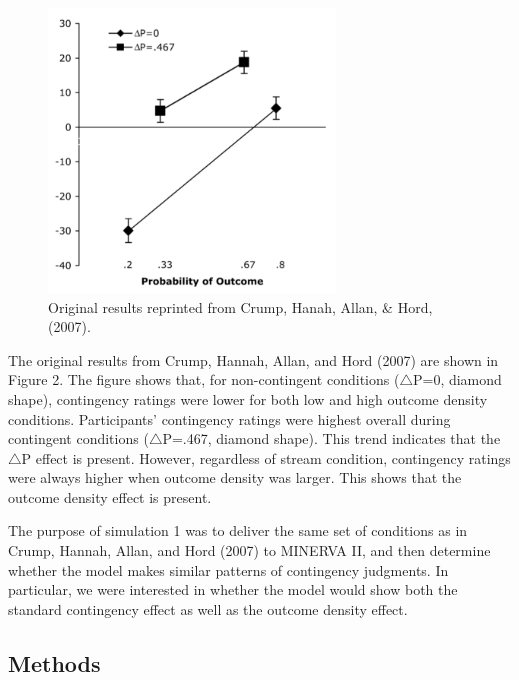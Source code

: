\documentclass[
  english,
  man,floatsintext]{apa6}
\begin{document}
\begin{figure}

{\centering \includegraphics[width=3in]{imgs/crump_results} 

}

\caption{Original results reprinted from Crump, Hanah, Allan, \& Hord, (2007).}\label{fig:unnamed-chunk-2}
\end{figure}

The original results from Crump, Hannah, Allan, and Hord (2007) are shown in Figure 2. The figure shows that, for non-contingent conditions (\(\triangle\)P=0, diamond shape), contingency ratings were lower for both low and high outcome density conditions. Participants' contingency ratings were highest overall during contingent conditions (\(\triangle\)P=.467, diamond shape). This trend indicates that the \(\triangle\)P effect is present. However, regardless of stream condition, contingency ratings were always higher when outcome density was larger. This shows that the outcome density effect is present.

The purpose of simulation 1 was to deliver the same set of conditions as in Crump, Hannah, Allan, and Hord (2007) to MINERVA II, and then determine whether the model makes similar patterns of contingency judgments. In particular, we were interested in whether the model would show both the standard contingency effect as well as the outcome density effect.

\hypertarget{methods}{%
\subsection{Methods}\label{methods}}
\end{document}
